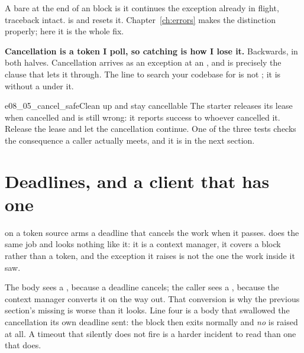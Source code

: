 
\begin{csbox}
A bare  at the end of an  block is 
\dash{} it continues the exception already in flight, traceback intact.
 is  and resets it. Chapter~\ref{ch:errors}
makes the distinction properly; here it is the whole fix.
\end{csbox}

\begin{trapbox}
\textbf{Cancellation is a token I poll, so catching  is
how I lose it.} Backwards, in both halves. Cancellation arrives as an
exception at an , and  is precisely the
clause that lets it through. The line to search your codebase for is not
; it is 
without a  under it.
\end{trapbox}

\begin{exercise}{e08_05_cancel_safe}{Clean up and stay cancellable}
The starter releases its lease when cancelled and is still wrong: it
reports success to whoever cancelled it. Release the lease and let the
cancellation continue. One of the three tests checks the consequence a
caller actually meets, and it is in the next section.
\end{exercise}

\section{Deadlines, and a client that has one}
\label{sec:asyncio-deadline}

 on a token source arms a deadline that cancels the work
when it passes.  does the same job and looks nothing
like it: it is a context manager, it covers a block rather than a token,
and the exception it raises is not the one the work inside it saw.



\noindent
The body sees a , because a deadline cancels; the
caller sees a , because the context manager converts it
on the way out. That conversion is why the previous section's missing
 is worse than it looks. Line four is a body that swallowed
the cancellation its own deadline sent: the block then exits normally and
\emph{no}  is raised at all. A timeout that silently
does not fire is a harder incident to read than one that does.


